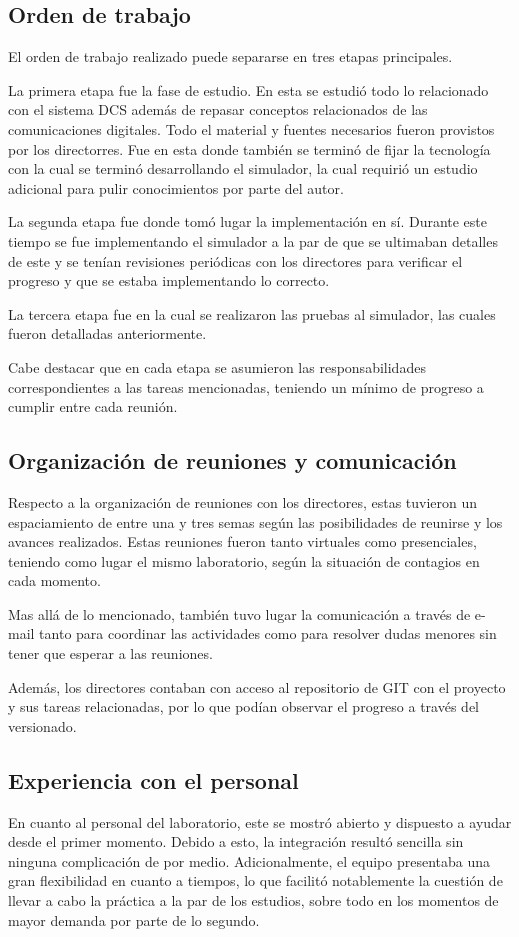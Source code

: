 \documentclass[a4paper,10pt]{article}
\begin{document}
\subsection{Orden de trabajo}
El orden de trabajo realizado puede separarse en tres etapas principales.
\par
La primera etapa fue la fase de estudio. En esta se estudió todo lo relacionado con el sistema DCS además de repasar conceptos relacionados de las comunicaciones digitales. Todo el material y fuentes necesarios fueron provistos por los directorres. Fue en
esta donde también se terminó de fijar la tecnología con la cual se terminó desarrollando el simulador, la cual requirió un estudio adicional para pulir conocimientos por parte del autor.
\par
La segunda etapa fue donde tomó lugar la implementación en sí. Durante este tiempo se fue implementando el simulador a la par de que se ultimaban detalles de este y se tenían revisiones periódicas con los directores para verificar el progreso y que se
estaba implementando lo correcto.
\par
La tercera etapa fue en la cual se realizaron las pruebas al simulador, las cuales fueron detalladas anteriormente.
\par
Cabe destacar que en cada etapa se asumieron las responsabilidades correspondientes a las tareas mencionadas, teniendo un mínimo de progreso a cumplir entre cada reunión.
\subsection{Organización de reuniones y comunicación}
Respecto a la organización de reuniones con los directores, estas tuvieron un espaciamiento de entre una y tres semas según las posibilidades de reunirse y los avances realizados. Estas reuniones fueron tanto virtuales como presenciales, teniendo como lugar el mismo laboratorio, según la situación de contagios en cada momento.
\par
Mas allá de lo mencionado, también tuvo lugar la comunicación a través de e-mail tanto para coordinar las actividades como para resolver dudas menores sin tener que esperar a las reuniones.
\par
Además, los directores contaban con acceso al repositorio de GIT con el proyecto y sus tareas relacionadas, por lo que podían observar el progreso a través del versionado.
\subsection{Experiencia con el personal}
En cuanto al personal del laboratorio, este se mostró abierto y dispuesto a ayudar desde el primer momento. Debido a esto, la integración resultó sencilla sin ninguna complicación de por medio. Adicionalmente, el equipo presentaba una gran flexibilidad en cuanto a tiempos,
lo que facilitó notablemente la cuestión de llevar a cabo la práctica a la par de los estudios, sobre todo en los momentos de mayor demanda por parte de lo segundo.
\end{document}
